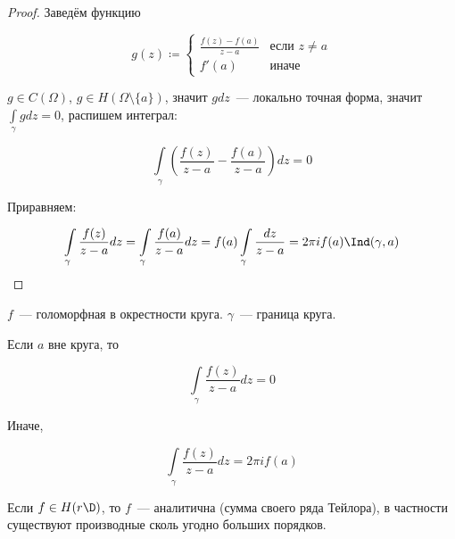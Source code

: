 \begin{proof}
    Заведём функцию

    \[
        g(z) \coloneqq
        \begin{cases}
            \frac{f(z) - f(a)}{z - a} & \text{если } z \ne a \\
            f'(a)                     & \text{иначе }
        \end{cases}
    \]

    $g \in C(\Omega)$, $g \in H(\Omega \setminus \{a\})$,
    значит $gdz$~--- локально точная форма,
    значит $\int\limits_\gamma gdz = 0$, распишем интеграл:

    \[
        \int\limits_\gamma \left(\frac{f(z)}{z-a} - \frac{f(a)}{z-a}\right) dz
        = 0
    \]

    Приравняем:

    \[
        \int\limits_\gamma \frac{f(z)}{z-a}dz
        = \int\limits_\gamma \frac{f(a)}{z-a}dz
        = f(a) \int\limits_\gamma \frac{dz}{z-a}
        = 2\pi i f(a) \Ind(\gamma, a)
    \]
\end{proof}

\begin{example}
    $f$~--- голоморфная в окрестности круга.
    $\gamma$~--- граница круга.

    Если $a$ вне круга, то

    \[
        \int\limits_\gamma \frac{f(z)}{z-a} dz = 0
    \]

    Иначе,

    \[
        \int\limits_\gamma \frac{f(z)}{z-a} dz = 2\pi i f(a)
    \]
\end{example}

\begin{theorem}
    Если $f \in H(r\D)$, то $f$~--- аналитична
    (сумма своего ряда Тейлора),
    в частности существуют производные сколь
    угодно больших порядков.
\end{theorem}

